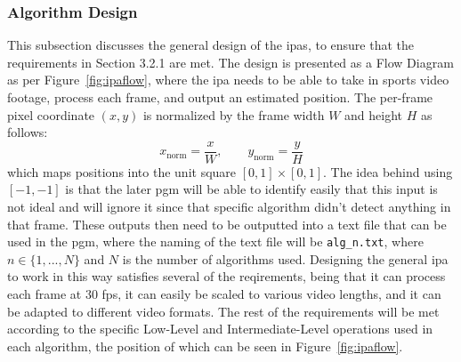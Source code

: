 \documentclass[12pt,a4paper]{article}
\begin{document}
\subsubsection{Algorithm Design}
This subsection discusses the general design of the \acs{ipa}s, to ensure that the requirements in Section 3.2.1 are met. The design is presented as a Flow Diagram as per Figure~\ref{fig:ipaflow}, where the \acs{ipa} needs to be able to take in sports video footage, process each frame, and output an estimated position. The per-frame pixel coordinate $(x,y)$ is normalized by the frame width $W$ and height $H$ as follows:
\begin{equation}
x_{\mathrm{norm}} = \frac{x}{W}, \qquad y_{\mathrm{norm}} = \frac{y}{H}
\end{equation}
which maps positions into the unit square $[0,1]\times[0,1]$. The idea behind using $[-1,-1]$ is that the later \acs{pgm} will be able to identify easily that this input is not ideal and will ignore it since that specific algorithm didn't detect anything in that frame. These outputs then need to be outputted into a text file that can be used in the \acs{pgm}, where the naming of the text file will be \texttt{alg\_n.txt}, where $n \in \{1,...,N\}$ and $N$ is the number of algorithms used. Designing the general \acs{ipa} to work in this way satisfies several of the reqirements, being that it can process each frame at 30 \acs{fps}, it can easily be scaled to various video lengths, and it can be adapted to different video formats. The rest of the requirements will be met according to the specific Low-Level and Intermediate-Level operations used in each algorithm, the position of which can be seen in Figure~\ref{fig:ipaflow}.
\end{document}
